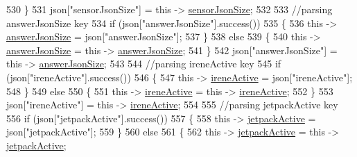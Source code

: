 \begin{DoxyCode}
530             \}
531             json[\textcolor{stringliteral}{"sensorJsonSize"}] = \textcolor{keyword}{this} -> \hyperlink{classCoolBoard_a58e4b6072e3ac8b141ec0befb479208e}{sensorJsonSize};
532             
533             \textcolor{comment}{//parsing answerJsonSize key            }
534             \textcolor{keywordflow}{if} (json[\textcolor{stringliteral}{"answerJsonSize"}].success())
535             \{
536                 \textcolor{keyword}{this} -> \hyperlink{classCoolBoard_af2da1f85315b3d074a8b87d158094fb7}{answerJsonSize} = json[\textcolor{stringliteral}{"answerJsonSize"}];
537             \}
538             \textcolor{keywordflow}{else}
539             \{
540                 \textcolor{keyword}{this} -> \hyperlink{classCoolBoard_af2da1f85315b3d074a8b87d158094fb7}{answerJsonSize} = \textcolor{keyword}{this} -> \hyperlink{classCoolBoard_af2da1f85315b3d074a8b87d158094fb7}{answerJsonSize};
541             \}
542             json[\textcolor{stringliteral}{"answerJsonSize"}] = \textcolor{keyword}{this} -> \hyperlink{classCoolBoard_af2da1f85315b3d074a8b87d158094fb7}{answerJsonSize};
543             
544             \textcolor{comment}{//parsing ireneActive key           }
545             \textcolor{keywordflow}{if} (json[\textcolor{stringliteral}{"ireneActive"}].success())
546             \{
547                 \textcolor{keyword}{this} -> \hyperlink{classCoolBoard_a9c3f7ac625481ee2ae802a25d97a4ae0}{ireneActive} = json[\textcolor{stringliteral}{"ireneActive"}];
548             \}
549             \textcolor{keywordflow}{else}
550             \{
551                 \textcolor{keyword}{this} -> \hyperlink{classCoolBoard_a9c3f7ac625481ee2ae802a25d97a4ae0}{ireneActive} = \textcolor{keyword}{this} -> \hyperlink{classCoolBoard_a9c3f7ac625481ee2ae802a25d97a4ae0}{ireneActive};
552             \}
553             json[\textcolor{stringliteral}{"ireneActive"}] = \textcolor{keyword}{this} -> \hyperlink{classCoolBoard_a9c3f7ac625481ee2ae802a25d97a4ae0}{ireneActive};
554             
555             \textcolor{comment}{//parsing jetpackActive key}
556             \textcolor{keywordflow}{if} (json[\textcolor{stringliteral}{"jetpackActive"}].success())
557             \{
558                 \textcolor{keyword}{this} -> \hyperlink{classCoolBoard_a9be03a913d26e558328935ca3b59a75e}{jetpackActive} = json[\textcolor{stringliteral}{"jetpackActive"}];
559             \}
560             \textcolor{keywordflow}{else}
561             \{
562                 \textcolor{keyword}{this} -> \hyperlink{classCoolBoard_a9be03a913d26e558328935ca3b59a75e}{jetpackActive} = \textcolor{keyword}{this} -> \hyperlink{classCoolBoard_a9be03a913d26e558328935ca3b59a75e}{jetpackActive};

\end{DoxyCode}
